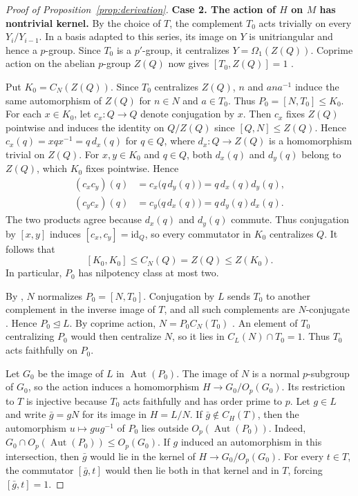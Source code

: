 \documentclass[11pt,a4paper]{article}
\theoremstyle{definition}
\theoremstyle{remark}
\numberwithin{equation}{section}
\DeclareMathOperator{\Aut}{Aut}
\begin{document}
\begin{proof}[Proof of Proposition~\ref{prop:derivation}]
		\smallskip\noindent\textbf{\boldmath Case 2. The action of $H$ on $M$ has nontrivial kernel.}
		By the choice of $T$, the complement $T_0$ acts trivially on every
		$Y_i/Y_{i-1}$. In a basis adapted to this series, its image on $Y$
		is unitriangular and hence a $p$-group. Since $T_0$ is a $p'$-group,
		it centralizes $Y=\Omega_1(Z(Q))$. Coprime action on the abelian
		$p$-group $Z(Q)$ now gives $[T_0,Z(Q)]=1$
		\cite[Corollary~4.35]{Isaacs2008}.
		
		Put $K_0=C_N(Z(Q))$. Since $T_0$ centralizes $Z(Q)$, $n$ and
		$ana^{-1}$ induce the same automorphism of $Z(Q)$ for $n\in N$ and
		$a\in T_0$. Thus $P_0=[N,T_0]\le K_0$. For each $x\in K_0$, let
		$c_x:Q\to Q$ denote conjugation by $x$. Then $c_x$ fixes $Z(Q)$
		pointwise and induces the identity on $Q/Z(Q)$ since $[Q,N]\le Z(Q)$.
		Hence $c_x(q)=xqx^{-1}=q\,d_x(q)$ for $q\in Q$, where
		$d_x:Q\to Z(Q)$ is a homomorphism trivial on $Z(Q)$.
		For $x,y\in K_0$ and $q\in Q$, both $d_x(q)$ and $d_y(q)$ belong
		to $Z(Q)$, which $K_0$ fixes pointwise. Hence
		\[
		\begin{aligned}
			(c_xc_y)(q)&=c_x\bigl(q\,d_y(q)\bigr)=q\,d_x(q)d_y(q),\\
			(c_yc_x)(q)&=c_y\bigl(q\,d_x(q)\bigr)=q\,d_y(q)d_x(q).
		\end{aligned}
		\]
		The two products agree because $d_x(q)$ and $d_y(q)$ commute.
		Thus conjugation by $[x,y]$ induces $[c_x,c_y]=\mathrm{id}_Q$,
		so every commutator in $K_0$ centralizes $Q$. It follows that
		\begin{equation}\label{eq:central-commutators}
			[K_0,K_0]\le C_N(Q)=Z(Q)\le Z(K_0).
		\end{equation}
		In particular, $P_0$ has nilpotency class at most two.
		
		By \cite[Lemma~4.1]{Isaacs2008}, $N$ normalizes $P_0=[N,T_0]$.
		Conjugation by $L$ sends $T_0$ to another complement in the inverse image of $T$,
		and all such complements are $N$-conjugate \cite[Theorem~3.12]{Isaacs2008}.
		Hence $P_0\unlhd L$. By coprime action,
		$N=P_0C_N(T_0)$ \cite[Lemma~4.28]{Isaacs2008}. An element of $T_0$
		centralizing $P_0$ would then centralize $N$, so it lies in
		$C_L(N)\cap T_0=1$. Thus $T_0$ acts faithfully on $P_0$.
		
		Let $G_0$ be the image of $L$ in $\Aut(P_0)$. The image of $N$ is
		a normal $p$-subgroup of $G_0$, so the action induces a homomorphism
		$H\to G_0/O_p(G_0)$. Its restriction to $T$ is injective because
		$T_0$ acts faithfully and has order prime to $p$. Let $g\in L$ and
		write $\bar g=gN$ for its image in $H=L/N$. If $\bar g\notin C_H(T)$,
		then the automorphism $u\mapsto gug^{-1}$ of $P_0$ lies outside
		$O_p(\Aut(P_0))$. Indeed, $G_0\cap O_p(\Aut(P_0))\le O_p(G_0)$.
		If $g$ induced an automorphism in this intersection, then $\bar g$
		would lie in the kernel of $H\to G_0/O_p(G_0)$. For every $t\in T$,
		the commutator $[\bar g,t]$ would then lie both in that kernel and
		in $T$, forcing $[\bar g,t]=1$.
		

\end{proof}
\end{document}
